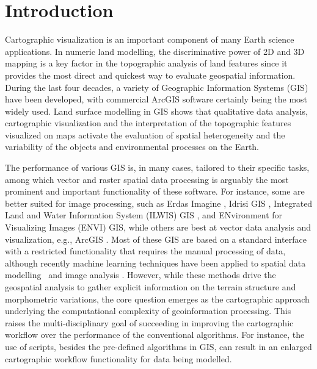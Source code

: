 \documentclass[land,article,accept,pdftex,moreauthors]{Definitions/mdpi}
\begin{document}
\section{Introduction}

Cartographic visualization is an important component of many Earth science applications. In numeric land modelling, the discriminative power of 2D and 3D mapping is a key factor in the topographic analysis of land features since it provides the most direct and quickest way to evaluate geospatial information. During the last four decades, a variety of Geographic Information Systems (GIS) have been developed, with commercial ArcGIS software certainly being the most widely used. Land surface modelling in GIS shows that qualitative data analysis, cartographic visualization and the interpretation of the topographic features visualized on maps {activate} the evaluation of spatial heterogeneity and the variability of the objects and environmental processes on the Earth. 

The performance of various GIS is, in many cases, tailored to their specific tasks, among which vector and raster spatial data processing is arguably the most prominent and important functionality of these software. For instance, some are better suited for image processing, such as Erdas Imagine \cite{IWAHASHI2010202}, Idrisi GIS \cite{land10040379,AYALEW200515}, Integrated Land and Water Information System (ILWIS) GIS \cite{BABIKER2005127}, and ENvironment for Visualizing Images (ENVI) GIS, while others are best at vector data analysis and visualization, e.g., ArcGIS \cite{OHTA2022108201,IKEMI2017115,IWAHASHI201229,NAKAYAMA2023110243,HANAOKA2014274}.
Most of these GIS are based on a standard interface with a restricted functionality that requires the manual processing of data, although recently machine learning techniques have been applied to spatial data modelling~\cite{THONGTHAMMACHART2022105447} and image analysis \cite{ALIFU2020107365,CARRASCO2022277}. However, while these methods drive the geospatial analysis to gather explicit information on the terrain structure and morphometric variations, the core question emerges as the cartographic approach underlying the computational complexity of geoinformation processing. This raises the multi-disciplinary goal of succeeding in improving the cartographic workflow over the performance of the conventional algorithms. For instance, the use of scripts, besides the pre-defined algorithms in GIS, can result in an enlarged cartographic workflow functionality for data being modelled. 
\end{document}
